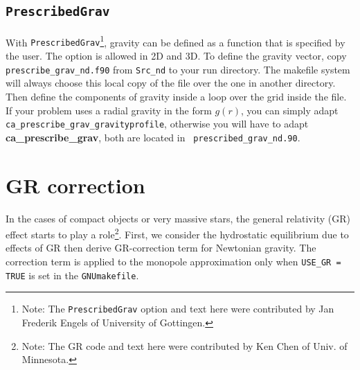 \subsection{{\tt PrescribedGrav}}

With {\tt PrescribedGrav}\footnote{Note: The {\tt PrescribedGrav}
  option and text here were contributed by Jan Frederik Engels of
  University of Gottingen.}, gravity can be defined as a function that
is specified by the user.  The option is allowed in 2D and 3D.  To
define the gravity vector, copy {\tt prescribe\_grav\_nd.f90} from
{\tt Src\_nd} to your run directory.  The makefile system will always
choose this local copy of the file over the one in another directory.
Then define the components of gravity inside a loop over the grid
inside the file.  If your problem uses a radial gravity in the form
$g(r)$, you can simply adapt {\tt
  ca\_prescribe\_grav\_gravityprofile}, otherwise you will have to
adapt {\bf ca\_prescribe\_grav}, both are located in {\tt
  prescribed\_grav\_nd.90}.


\section{GR correction}


In the cases of compact objects or very massive stars, the general
relativity (GR) effect starts to play a role\footnote{Note: The GR
  code and text here were contributed by Ken Chen of Univ. of
  Minnesota.}.  First, we consider the hydrostatic equilibrium due to
effects of GR then derive GR-correction term for Newtonian gravity.
The correction term is applied to the monopole approximation only when
{\tt USE\_GR = TRUE} is set in the {\tt GNUmakefile}.

